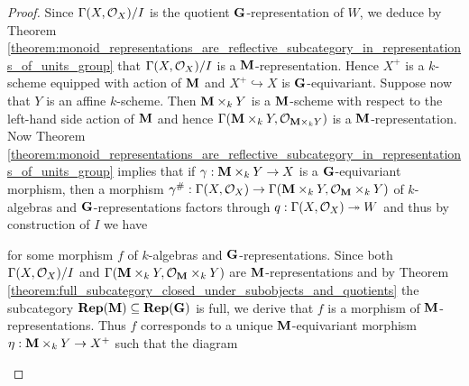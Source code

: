 \begin{proof}
Since $\Gamma(X,{\mathcal O}_X)/I$ is the quotient $\mathbf{G}$-representation of $W$, we deduce by Theorem \ref{theorem:monoid_representations_are_reflective_subcategory_in_representations_of_units_group} that $\Gamma(X,{\mathcal O}_X)/I$ is a $\mathbf{M}$-representation. Hence $X^+$ is a $k$-scheme equipped with action of $\mathbf{M}$ and $X^+\hookrightarrow X$ is $\mathbf{G}$-equivariant. Suppose now that $Y$ is an affine $k$-scheme. Then $\mathbf{M}\times_kY$ is a $\mathbf{M}$-scheme with respect to the left-hand side action of $\mathbf{M}$ and hence $\Gamma(\mathbf{M}\times_kY,{\mathcal O}_{\mathbf{M}\times_kY})$ is a $\mathbf{M}$-representation. Now Theorem \ref{theorem:monoid_representations_are_reflective_subcategory_in_representations_of_units_group} implies that if $\gamma:\mathbf{M}\times_kY\rightarrow X$ is a $\mathbf{G}$-equivariant morphism, then a morphism $\gamma^{\#}:\Gamma(X,{\mathcal O}_X)\rightarrow \Gamma(\mathbf{M}\times_kY,{\mathcal O}_{\mathbf{M}}\times_kY)$ of $k$-algebras and $\mathbf{G}$-representations factors through $q:\Gamma(X,{\mathcal O}_X)\twoheadrightarrow W$ and thus by construction of $I$ we have
\begin{center}
\end{center}
for some morphism $f$ of $k$-algebras and $\mathbf{G}$-representations. Since both $\Gamma(X,{\mathcal O}_X)/I$ and $\Gamma(\mathbf{M}\times_kY,{\mathcal O}_{\mathbf{M}}\times_kY)$ are $\mathbf{M}$-representations and by Theorem \ref{theorem:full_subcategory_closed_under_subobjects_and_quotients} the subcategory $\mathbf{Rep}(\mathbf{M})\subseteq \mathbf{Rep}(\mathbf{G})$ is full, we derive that $f$ is a morphism of $\mathbf{M}$-representations. Thus $f$ corresponds to a unique $\mathbf{M}$-equivariant morphism $\eta:\mathbf{M}\times_kY\rightarrow X^+$ such that the diagram
\begin{center}
\end{center}
\end{proof}
